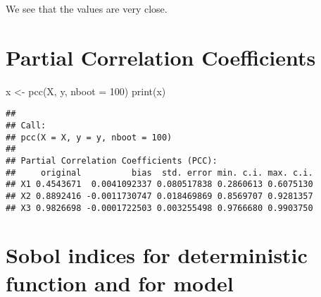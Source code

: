 \documentclass[
  11pt,
]{book}
\newenvironment{Shaded}{\begin{snugshade}}{\end{snugshade}}
\newcommand{\AttributeTok}[1]{\textcolor[rgb]{0.77,0.63,0.00}{#1}}
\newcommand{\DecValTok}[1]{\textcolor[rgb]{0.00,0.00,0.81}{#1}}
\newcommand{\FunctionTok}[1]{\textcolor[rgb]{0.00,0.00,0.00}{#1}}
\newcommand{\NormalTok}[1]{#1}
\newcommand{\OtherTok}[1]{\textcolor[rgb]{0.56,0.35,0.01}{#1}}
\begin{document}
We see that the values are very close.

\hypertarget{partial-correlation-coefficients}{%
\section{Partial Correlation Coefficients}\label{partial-correlation-coefficients}}

\begin{Shaded}
\begin{Highlighting}[]
\NormalTok{x }\OtherTok{\textless{}{-}} \FunctionTok{pcc}\NormalTok{(X, y, }\AttributeTok{nboot =} \DecValTok{100}\NormalTok{)}
\FunctionTok{print}\NormalTok{(x)}
\end{Highlighting}
\end{Shaded}

\begin{verbatim}
## 
## Call:
## pcc(X = X, y = y, nboot = 100)
## 
## Partial Correlation Coefficients (PCC):
##     original          bias  std. error min. c.i. max. c.i.
## X1 0.4543671  0.0041092337 0.080517838 0.2860613 0.6075130
## X2 0.8892416 -0.0011730747 0.018469869 0.8569707 0.9281357
## X3 0.9826698 -0.0001722503 0.003255498 0.9766680 0.9903750
\end{verbatim}

\hypertarget{sobol-indices-for-deterministic-function-and-for-model}{%
\section{Sobol indices for deterministic function and for model}\label{sobol-indices-for-deterministic-function-and-for-model}}
\end{document}
